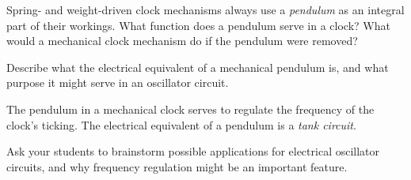 

Spring- and weight-driven clock mechanisms always use a {\it pendulum} as an integral part of their workings.  What function does a pendulum serve in a clock?  What would a mechanical clock mechanism do if the pendulum were removed?

Describe what the electrical equivalent of a mechanical pendulum is, and what purpose it might serve in an oscillator circuit.







The pendulum in a mechanical clock serves to regulate the frequency of the clock's ticking.  The electrical equivalent of a pendulum is a {\it tank circuit}.







Ask your students to brainstorm possible applications for electrical oscillator circuits, and why frequency regulation might be an important feature.




